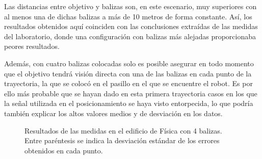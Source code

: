 Las distancias entre objetivo y balizas son, en este escenario, muy superiores con al menos una de dichas balizas a más de 10 metros de forma constante.
Así, los resultados obtenidos aquí coinciden con las conclusiones extraídas de las medidas del laboratorio, donde una configuración con balizas más alejadas proporcionaba peores resultados.

Además, con cuatro balizas colocadas solo es posible asegurar en todo momento que el objetivo tendrá visión directa con una de las balizas en cada punto de la trayectoria, la que se colocó en el pasillo en el que se encuentre el robot.
Es por ello más probable que se hayan dado en esta primera trayectoria casos en los que la señal utilizada en el posicionamiento se haya visto entorpecida, lo que podría también explicar los altos valores medios y de desviación en los datos.

\begin{figure}[H]
    \centering
    
    \caption{Resultados de las medidas en el edificio de Física con 4 balizas. \newline Entre paréntesis se indica la desviación estándar de los errores obtenidos en cada punto.}
    \label{fig:res_fisica_4}
\end{figure}

